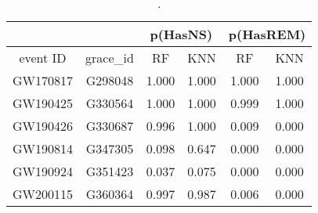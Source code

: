 \begin{table}[]
\begin{tabular}{c|c|cc|cc}
\hline
\multicolumn{1}{c|}{}         & \multicolumn{1}{l|}{} & \multicolumn{2}{c|}{p(HasNS)}                                                & \multicolumn{2}{c}{p(HasREM)}                                                \\ \hline
\multicolumn{1}{c|}{event ID} & grace\_id             & \multicolumn{1}{c}{RF} & \multicolumn{1}{c}{KNN}  & \multicolumn{1}{c}{RF} & \multicolumn{1}{c}{KNN} \\ \hline
GW170817                      & G298048               & 1.000                   & 1.000                    & 1.000                   & 1.000                                  \\
GW190425                      & G330564               & 1.000                   & 1.000                    & 0.999                   & 1.000                             \\
GW190426                      & G330687               & 0.996                   & 1.000                    & 0.009                   & 0.000                     \\
GW190814                      & G347305               & 0.098                   & 0.647                    & 0.000                   & 0.000                      \\
GW190924                      & G351423               & 0.037                   & 0.075                    & 0.000                   & 0.000                       \\               
GW200115                      & G360364               & 0.997                   & 0.987                   & 0.006                   & 0.000                           \\
\hline
\end{tabular}
\caption{.}
\label{tab:real_data_short}
\end{table}
